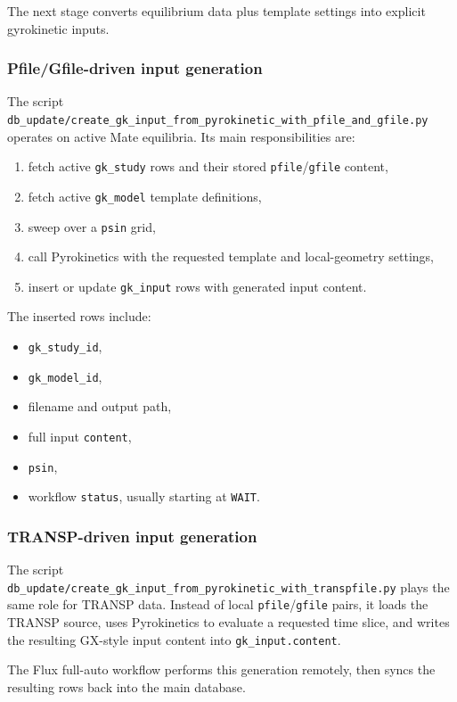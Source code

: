 \documentclass[11pt]{article}
\newcommand{\code}[1]{\texttt{#1}}
\begin{document}
The next stage converts equilibrium data plus template settings into explicit
gyrokinetic inputs.

\subsubsection{Pfile/Gfile-driven input generation}

The script
\code{db\_update/create\_gk\_input\_from\_pyrokinetic\_with\_pfile\_and\_gfile.py}
operates on active Mate equilibria. Its main responsibilities are:

\begin{enumerate}
\item fetch active \code{gk\_study} rows and their stored \code{pfile}/\code{gfile} content,
\item fetch active \code{gk\_model} template definitions,
\item sweep over a \code{psin} grid,
\item call Pyrokinetics with the requested template and local-geometry settings,
\item insert or update \code{gk\_input} rows with generated input content.
\end{enumerate}

The inserted rows include:

\begin{itemize}
\item \code{gk\_study\_id},
\item \code{gk\_model\_id},
\item filename and output path,
\item full input \code{content},
\item \code{psin},
\item workflow \code{status}, usually starting at \code{WAIT}.
\end{itemize}

\subsubsection{TRANSP-driven input generation}

The script
\code{db\_update/create\_gk\_input\_from\_pyrokinetic\_with\_transpfile.py}
plays the same role for TRANSP data. Instead of local \code{pfile}/\code{gfile}
pairs, it loads the TRANSP source, uses Pyrokinetics to evaluate a requested
time slice, and writes the resulting GX-style input content into
\code{gk\_input.content}.

The Flux full-auto workflow performs this generation remotely, then syncs the
resulting rows back into the main database.
\end{document}
